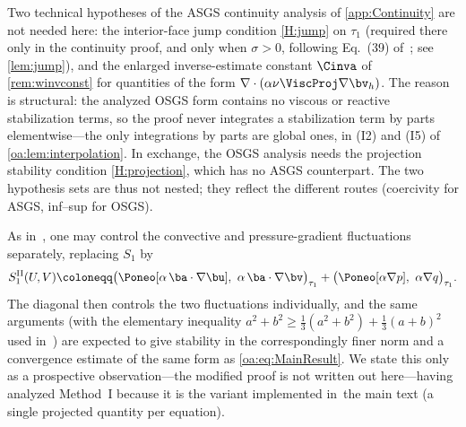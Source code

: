 \begin{remark}
\label{oa:rem:dispensed}
Two technical hypotheses of the ASGS continuity analysis of \cref{app:Continuity} are not
needed here: the interior-face jump condition \cref{H:jump} on $\tau_1$ (required there only in
the continuity proof, and only when $\sigma > 0$, following Eq.~(39)
of~\cite{codina2001stabilized}; see \cref{lem:jump}), and the enlarged inverse-estimate constant
$\Cinva$ of \cref{rem:winvconst} for quantities of the form
$\nabla\cdot(\alpha\nu\ViscProj\nabla\bv_h)$. The reason is structural: the analyzed
OSGS form contains no viscous or reactive stabilization terms, so the proof never
integrates a stabilization term by parts elementwise---the only integrations by parts
are global ones, in (I2) and (I5) of \cref{oa:lem:interpolation}. In exchange, the OSGS
analysis needs the projection stability condition \cref{H:projection}, which has no ASGS
counterpart. The two hypothesis sets are thus not nested; they reflect the different
routes (coercivity for ASGS, inf--sup for OSGS).
\end{remark}

\begin{remark}
\label{oa:rem:methodII}
As in~\cite[\S 2.2]{codina2008analysis}, one may control the convective and pressure-gradient
fluctuations separately, replacing $S_1$ by
\[
  S_1^{\mathrm{II}}(U,V) \coloneqq
  \bigl( \Poneo[\alpha\,\ba\cdot\nabla\bu],\ \alpha\,\ba\cdot\nabla\bv \bigr)_{\tau_1}
  + \bigl( \Poneo[\alpha\nabla p],\ \alpha\nabla q \bigr)_{\tau_1}.
\]
The diagonal then controls the two fluctuations individually, and the same arguments
(with the elementary inequality $a^2 + b^2 \ge \tfrac13(a^2+b^2) + \tfrac13(a+b)^2$
used in~\cite[Theorem~3]{codina2008analysis}) are expected to give stability in the correspondingly
finer norm and a convergence estimate of the same form as \cref{oa:eq:MainResult}. We state
this only as a prospective observation---the modified proof is not written out here---having
analyzed Method~I because it is the variant implemented in~the main text (a single
projected quantity per equation).
\end{remark}

